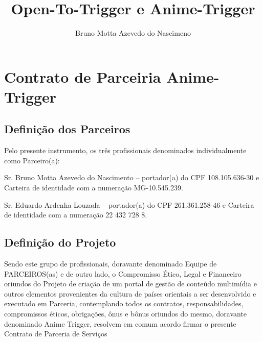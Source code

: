 \documentclass[article]{abntex2}
\title{Open-To-Trigger e Anime-Trigger}
\author{Bruno Motta Azevedo do Nascimeno}
\begin{document}






\chapter*{Contrato de Parceiria Anime-Trigger}
\section*{Definição dos Parceiros}
Pelo presente instrumento, os três profissionais denominados individualmente como Parceiro(a):

Sr. Bruno Motta Azevedo do Nascimento  – portador(a) do CPF 108.105.636-30 e Carteira de identidade com a numeração MG-10.545.239.

Sr. Eduardo Ardenha Louzada  – portador(a) do CPF 261.361.258-46 e Carteira de identidade com a numeração  22 432 728 8.

\section*{Definição do Projeto}
Sendo este grupo de profissionais, doravante denominado Equipe de PARCEIROS(as) e de outro lado, o Compromisso Ético, Legal e Financeiro oriundos do Projeto de criação de um portal de gestão de conteúdo multimídia e outros elementos provenientes da cultura de países orientais a ser desenvolvido e executado em Parceria, contemplando todos os contratos, responsabilidades, compromissos éticos, obrigações, ônus e bônus oriundos do mesmo, doravante denominado Anime Trigger, resolvem em comum acordo firmar o presente Contrato de Parceria de Serviços
\end{document}
